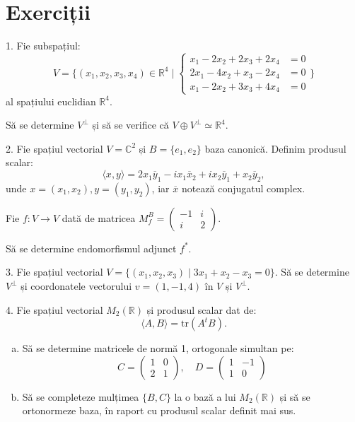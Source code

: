 \documentclass[11pt,a4paper]{article}
\newcommand\RR{\mathbb{R}}
\newcommand\CC{\mathbb{C}}
\theoremstyle{dotless}
\theoremstyle{dotlessdr}
\begin{document}
\section{Exerciții}
\label{sec:exc}



1. Fie subspațiul:
\[
  V = \{(x_1, x_2, x_3, x_4) \in \RR^4 \mid
  \begin{cases}
    x_1 - 2x_2 + 2x_3 + 2x_4 &= 0 \\
    2x_1 - 4x_2 + x_3 - 2x_4 &= 0 \\
    x_1 - 2x_2 + 3x_3 + 4x_4 &= 0
  \end{cases} \}
\]
al spațiului euclidian $\RR^4$.

Să se determine $V^\perp$ și să se verifice că $V \oplus V^\perp \simeq \RR^4$.

\vspace{1cm}

2. Fie spațiul vectorial $V = \CC^2$ și $B = \{e_1, e_2\}$ baza canonică.
Definim produsul scalar:
\[
  \langle x, y \rangle = 2x_1 \overline{y}_1 - ix_1 \overline{x}_2 + ix_2 \overline{y}_1 + %
  x_2 \overline{y}_2,
\]
unde $x = (x_1, x_2), y = (y_1, y_2)$, iar $\overline{x}$ notează conjugatul complex.

Fie $f : V \to V$ dată de matricea $M_f^B = \begin{pmatrix} -1 & i \\ i & 2 \end{pmatrix}$.

Să se determine endomorfismul adjunct $f^\ast$.

\vspace{1cm}

3. Fie spațiul vectorial $V = \{(x_1, x_2, x_3) \mid 3x_1 + x_2 - x_3 = 0 \}$.
Să se determine $V^\perp$ și coordonatele vectorului $v = (1, -1, 4)$ în $V$ și $V^\perp$.

\vspace{1cm}

4. Fie spațiul vectorial $M_2(\RR)$ și produsul scalar dat de:
\[
  \langle A, B \rangle = \mathrm{tr}(A^t B).
\]

\begin{enumerate}[(a)]
  \item Să se determine matricele de normă 1, ortogonale simultan pe:
\[
  C = \begin{pmatrix}
    1 & 0 \\
    2 & 1
  \end{pmatrix}, \quad
  D = \begin{pmatrix}
    1 & -1 \\
    1 & 0
  \end{pmatrix}
\]
\item Să se completeze mulțimea $\{B, C\}$ la o bază a lui $M_2(\RR)$ și să se
  ortonormeze baza, în raport cu produsul scalar definit mai sus.
\end{enumerate}
\end{document}
